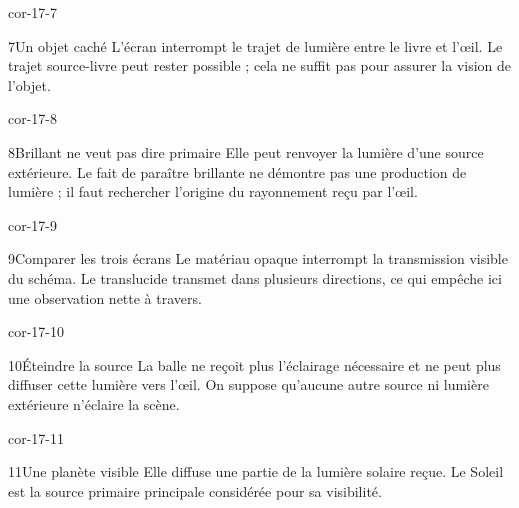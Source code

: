 \documentclass[12pt,twoside,openany]{book}
\begin{document}
\begin{blocLivre}{cor-17-7}
\begin{corrige}{7}{Un objet caché}
L’écran interrompt le trajet de lumière entre le livre et l’œil. Le trajet source-livre peut rester possible ; cela ne suffit pas pour assurer la vision de l’objet.\par
{}
\end{corrige}\end{blocLivre}
\begin{blocLivre}{cor-17-8}
\begin{corrige}{8}{Brillant ne veut pas dire primaire}
Elle peut renvoyer la lumière d’une source extérieure. Le fait de paraître brillante ne démontre pas une production de lumière ; il faut rechercher l’origine du rayonnement reçu par l’œil.\par
\end{corrige}\end{blocLivre}
\begin{blocLivre}{cor-17-9}
\begin{corrige}{9}{Comparer les trois écrans}
Le matériau opaque interrompt la transmission visible du schéma. Le translucide transmet dans plusieurs directions, ce qui empêche ici une observation nette à travers.\par
{}
\end{corrige}\end{blocLivre}
\begin{blocLivre}{cor-17-10}
\begin{corrige}{10}{Éteindre la source}
La balle ne reçoit plus l’éclairage nécessaire et ne peut plus diffuser cette lumière vers l’œil. On suppose qu’aucune autre source ni lumière extérieure n’éclaire la scène.\par
\end{corrige}\end{blocLivre}
\begin{blocLivre}{cor-17-11}
\begin{corrige}{11}{Une planète visible}
Elle diffuse une partie de la lumière solaire reçue. Le Soleil est la source primaire principale considérée pour sa visibilité.\par
\end{corrige}\end{blocLivre}
\end{document}
